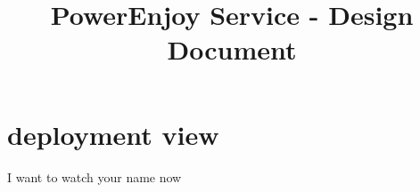 \documentclass{article}
\title{PowerEnjoy Service - Design Document}
\begin{document}
	\section{deployment view}
		I want to watch your name now
\end{document}
